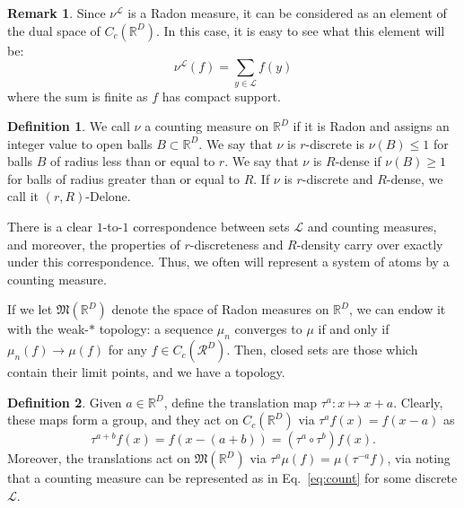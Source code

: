 \documentclass[aps,pra,showpacs,notitlepage,onecolumn,superscriptaddress,nofootinbib]{revtex4-1}
\theoremstyle{definition}
\newtheorem{definition}{Definition}[section]
\newtheorem{remark}{Remark}[section]
\begin{document}
\begin{remark}
    Since $\nu^{\mathcal{L}}$ is a Radon measure, it can be considered as an element of the dual space of $C_{c}(\mathbb{R}^{D})$. In this case, it is easy to see what this element will be:
    \begin{equation}
    \label{eq:count}
        \nu^{\mathcal{L}}(f) = \displaystyle\sum_{y \in \mathcal{L}} f(y)
    \end{equation}
    where the sum is finite as $f$ has compact support.
\end{remark}

\begin{definition}
    We call $\nu$ a counting measure on $\mathbb{R}^{D}$ if it is Radon and assigns an integer value to open balls $B \subset \mathbb{R}^{D}$. We say that $\nu$ is $r$-discrete is $\nu(B) \leq 1$ for balls $B$ of radius less than or equal to $r$. We say that $\nu$ is $R$-dense if $\nu(B) \geq 1$ for balls of radius greater than or equal to $R$. If $\nu$ is $r$-discrete and $R$-dense, we call it $(r, R)$-Delone.
\end{definition}

\noindent There is a clear $1$-to-$1$ correspondence between sets $\mathcal{L}$ and counting measures, and moreover, the properties of $r$-discreteness and $R$-density carry over exactly under this correspondence. Thus, we often will represent a system of atoms by a counting measure.

If we let $\mathfrak{M}(\mathbb{R}^{D})$ denote the space of Radon measures on $\mathbb{R}^{D}$, we can endow it with the weak-$*$ topology: a sequence $\mu_n$ converges to $\mu$ if and only if $\mu_n(f) \rightarrow \mu(f)$ for any $f \in C_c(\mathcal{R}^{D})$. Then, closed sets are those which contain their limit points, and we have a topology.

\begin{definition}
    Given $a \in \mathbb{R}^{D}$, define the translation map $\tau^a : x \mapsto x + a$. Clearly, these maps form a group, and they act on $C_c(\mathbb{R}^{D})$ via $\tau^a f(x) = f(x - a)$ as
    \begin{equation}
    \tau^{a + b} f(x) = f(x - (a + b)) = (\tau^{a} \circ \tau^{b})f(x).
    \end{equation}
    Moreover, the translations act on $\mathfrak{M}(\mathbb{R}^{D})$ via $\tau^{a} \mu(f) = \mu(\tau^{-a} f)$, via noting that a counting measure can be represented as in Eq.~\eqref{eq:count} for some discrete $\mathcal{L}$.
\end{definition}
\end{document}
